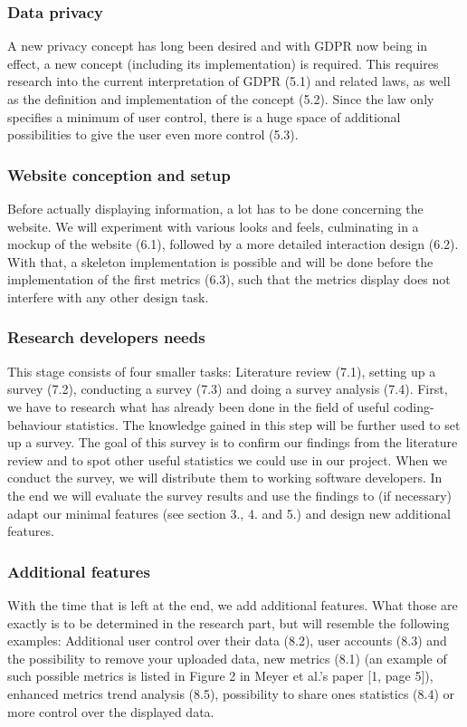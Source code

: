 \documentclass{seal_article}
\begin{document}
\subsubsection{Data privacy}
A new privacy concept has long been desired and with GDPR now being in effect, a new concept (including its implementation) is required. This requires research into the current interpretation of GDPR (5.1) and related laws, as well as the definition and implementation of the concept (5.2). Since the law only specifies a minimum of user control, there is a huge space of additional possibilities to give the user even more control (5.3).

\subsubsection{Website conception and setup}
Before actually displaying information, a lot has to be done concerning the website. We will experiment with various looks and feels, culminating in a mockup of the website (6.1), followed by a more detailed interaction design (6.2). With that, a skeleton implementation is possible and will be done before the implementation of the first metrics (6.3), such that the metrics display does not interfere with any other design task.

\subsubsection{Research developers needs}
This stage consists of four smaller tasks: Literature review (7.1), setting up a survey (7.2), conducting a survey (7.3) and doing a survey analysis (7.4). First, we have to research what has already been done in the field of useful coding-behaviour statistics. The knowledge gained in this step will be further used to set up a survey. The goal of this survey is to confirm our findings from the literature review and to spot other useful statistics we could use in our project. When we conduct the survey, we will distribute them to working software developers. In the end we will evaluate the survey results and use the findings to (if necessary) adapt our minimal features (see section 3., 4. and 5.) and design new additional features.

\subsubsection{Additional features}
With the time that is left at the end, we add additional features. What those are exactly is to be determined in the research part, but will resemble the following examples: Additional user control over their data (8.2), user accounts (8.3) and the possibility to remove your uploaded data, new metrics (8.1) (an example of such possible metrics is listed in Figure 2 in Meyer et al.’s paper [1, page 5]), enhanced metrics trend analysis (8.5), possibility to share ones statistics (8.4) or more control over the displayed data.
\end{document}

